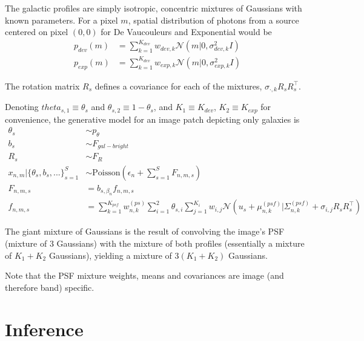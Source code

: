 \documentclass[11pt]{article}
\newcommand{\trans}{\intercal}
\begin{document}

The galactic profiles are simply isotropic, concentric mixtures of Gaussians with known parameters.  For a pixel $m$, spatial distribution of photons from a source centered on pixel $(0,0)$ for De Vaucouleurs and Exponential would be
\begin{align}
  p_{dev}(m) &= \sum_{k=1}^{K_{dev}} w_{dev, k} \mathcal{N}\left(m | 0, \sigma^2_{dev, k} I \right) \\
  p_{exp}(m) &= \sum_{k=1}^{K_{dev}} w_{exp, k} \mathcal{N}\left(m | 0, \sigma^2_{exp, k} I \right)
\end{align}

The rotation matrix $R_s$ defines a covariance for each of the mixtures, $\sigma_{\cdot, k} R_s R_s^\trans$. 

Denoting $theta_{s,1} \equiv \theta_{s}$ and $\theta_{s,2} \equiv 1-\theta_{s}$, and $K_1 \equiv K_{dev}$, $K_2 \equiv K_{exp}$ for convenience, the generative model for an image patch depicting only galaxies is 
\begin{align}
  \theta_s &\sim p_\theta \\
  b_s      &\sim F_{gal-bright} \\
  R_s      &\sim F_{R} \\
  x_{n,m} | \{ \theta_s, b_s,...\}_{s=1}^S &\sim \textrm{Poisson}\left( \epsilon_n + \sum_{s=1}^S F_{n,m,s} \right) \\
  F_{n,m,s} &= b_{s, \beta_n} f_{n,m,s} \\
  f_{n,m,s} 
    &= \sum_{k=1}^{K_{psf}} w^{(ps)}_{n,k} 
       \sum_{i=1}^2 \theta_{s,i} 
       \sum_{j=1}^{K_i} w_{i, j} \mathcal{N} \left( u_s + \mu^{(psf)}_{n,k} | \Sigma^{(psf)}_{n,k} + \sigma_{i,j} R_s R_s^\trans \right)
\end{align}

The giant mixture of Gaussians is the result of convolving the image's PSF (mixture of 3 Gaussians) with the mixture of both profiles (essentially a mixture of $K_1 + K_2$ Gaussians), yielding a mixture of $3(K_1 + K_2)$ Gaussians.  
 
Note that the PSF mixture weights, means and covariances are image (and therefore band) specific. 


\section{Inference}
\end{document}
